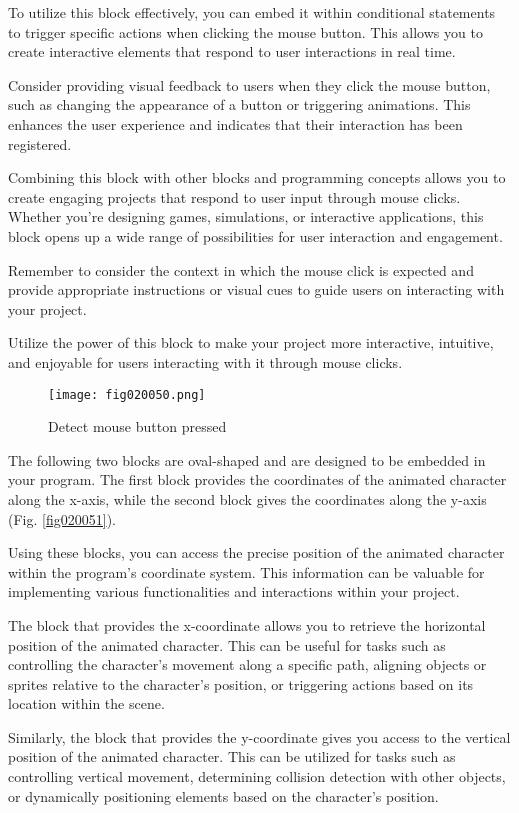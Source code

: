 To utilize this block effectively, you can embed it within conditional statements to trigger specific actions when clicking the mouse button. This allows you to create interactive elements that respond to user interactions in real time.

Consider providing visual feedback to users when they click the mouse button, such as changing the appearance of a button or triggering animations. This enhances the user experience and indicates that their interaction has been registered.

Combining this block with other blocks and programming concepts allows you to create engaging projects that respond to user input through mouse clicks. Whether you're designing games, simulations, or interactive applications, this block opens up a wide range of possibilities for user interaction and engagement.

Remember to consider the context in which the mouse click is expected and provide appropriate instructions or visual cues to guide users on interacting with your project.

Utilize the power of this block to make your project more interactive, intuitive, and enjoyable for users interacting with it through mouse clicks.

\begin{figure}[H]
   \centering
   \texttt{[image: fig020050.png]}
   \caption{Detect mouse button pressed}
\label{fig020050}
\end{figure}

The following two blocks are oval-shaped and are designed to be embedded in your program. The first block provides the coordinates of the animated character along the x-axis, while the second block gives the coordinates along the y-axis (Fig. \ref{fig020051}).

Using these blocks, you can access the precise position of the animated character within the program's coordinate system. This information can be valuable for implementing various functionalities and interactions within your project.

The block that provides the x-coordinate allows you to retrieve the horizontal position of the animated character. This can be useful for tasks such as controlling the character's movement along a specific path, aligning objects or sprites relative to the character's position, or triggering actions based on its location within the scene.

Similarly, the block that provides the y-coordinate gives you access to the vertical position of the animated character. This can be utilized for tasks such as controlling vertical movement, determining collision detection with other objects, or dynamically positioning elements based on the character's position.


